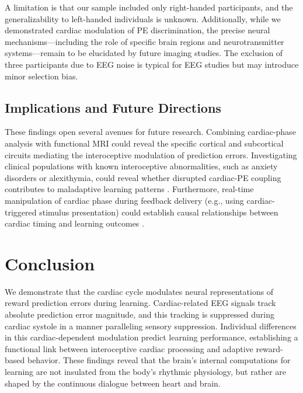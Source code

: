 \documentclass[12pt]{article}
\begin{document}
A limitation is that our sample included only right-handed participants, and the generalizability to left-handed individuals is unknown. Additionally, while we demonstrated cardiac modulation of PE discrimination, the precise neural mechanisms---including the role of specific brain regions and neurotransmitter systems---remain to be elucidated by future imaging studies. The exclusion of three participants due to EEG noise is typical for EEG studies but may introduce minor selection bias.

\subsection{Implications and Future Directions}

These findings open several avenues for future research. Combining cardiac-phase analysis with functional MRI could reveal the specific cortical and subcortical circuits mediating the interoceptive modulation of prediction errors. Investigating clinical populations with known interoceptive abnormalities, such as anxiety disorders or alexithymia, could reveal whether disrupted cardiac-PE coupling contributes to maladaptive learning patterns \citep{paulus2010interoception}. Furthermore, real-time manipulation of cardiac phase during feedback delivery (e.g., using cardiac-triggered stimulus presentation) could establish causal relationships between cardiac timing and learning outcomes \citep{azevedo2017cardiac}.

\section{Conclusion}

We demonstrate that the cardiac cycle modulates neural representations of reward prediction errors during learning. Cardiac-related EEG signals track absolute prediction error magnitude, and this tracking is suppressed during cardiac systole in a manner paralleling sensory suppression. Individual differences in this cardiac-dependent modulation predict learning performance, establishing a functional link between interoceptive cardiac processing and adaptive reward-based behavior. These findings reveal that the brain's internal computations for learning are not insulated from the body's rhythmic physiology, but rather are shaped by the continuous dialogue between heart and brain.



\end{document}
